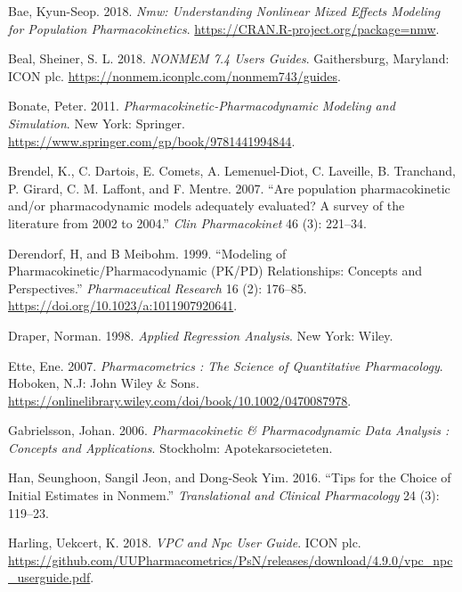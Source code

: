 \documentclass[
  11pt,
  krantz2, a4paper, twoside]{krantz}
\newlength{\cslhangindent}
\newenvironment{cslreferences}%
  {\setlength{\parindent}{0pt}%
  \everypar{\setlength{\hangindent}{\cslhangindent}}\ignorespaces}%
  {\par}
\theoremstyle{definition}
\theoremstyle{definition}
\theoremstyle{definition}
\theoremstyle{remark}
\begin{document}
\hypertarget{refs}{}
\begin{cslreferences}
\leavevmode\hypertarget{ref-R-nmw}{}%
Bae, Kyun-Seop. 2018. \emph{Nmw: Understanding Nonlinear Mixed Effects Modeling for Population Pharmacokinetics}. \url{https://CRAN.R-project.org/package=nmw}.

\leavevmode\hypertarget{ref-nonmem}{}%
Beal, Sheiner, S. L. 2018. \emph{NONMEM 7.4 Users Guides}. Gaithersburg, Maryland: ICON plc. \url{https://nonmem.iconplc.com/nonmem743/guides}.

\leavevmode\hypertarget{ref-bonate}{}%
Bonate, Peter. 2011. \emph{Pharmacokinetic-Pharmacodynamic Modeling and Simulation}. New York: Springer. \url{https://www.springer.com/gp/book/9781441994844}.

\leavevmode\hypertarget{ref-pmid17328581}{}%
Brendel, K., C. Dartois, E. Comets, A. Lemenuel-Diot, C. Laveille, B. Tranchand, P. Girard, C. M. Laffont, and F. Mentre. 2007. ``Are population pharmacokinetic and/or pharmacodynamic models adequately evaluated? A survey of the literature from 2002 to 2004.'' \emph{Clin Pharmacokinet} 46 (3): 221--34.

\leavevmode\hypertarget{ref-derendorf1999modeling}{}%
Derendorf, H, and B Meibohm. 1999. ``Modeling of Pharmacokinetic/Pharmacodynamic (PK/PD) Relationships: Concepts and Perspectives.'' \emph{Pharmaceutical Research} 16 (2): 176--85. \url{https://doi.org/10.1023/a:1011907920641}.

\leavevmode\hypertarget{ref-draper1998applied}{}%
Draper, Norman. 1998. \emph{Applied Regression Analysis}. New York: Wiley.

\leavevmode\hypertarget{ref-ette}{}%
Ette, Ene. 2007. \emph{Pharmacometrics : The Science of Quantitative Pharmacology}. Hoboken, N.J: John Wiley \& Sons. \url{https://onlinelibrary.wiley.com/doi/book/10.1002/0470087978}.

\leavevmode\hypertarget{ref-gabrielsson}{}%
Gabrielsson, Johan. 2006. \emph{Pharmacokinetic \& Pharmacodynamic Data Analysis : Concepts and Applications}. Stockholm: Apotekarsocieteten.

\leavevmode\hypertarget{ref-han2016tips}{}%
Han, Seunghoon, Sangil Jeon, and Dong-Seok Yim. 2016. ``Tips for the Choice of Initial Estimates in Nonmem.'' \emph{Translational and Clinical Pharmacology} 24 (3): 119--23.

\leavevmode\hypertarget{ref-vpcnpc}{}%
Harling, Uekcert, K. 2018. \emph{VPC and Npc User Guide}. ICON plc. \url{https://github.com/UUPharmacometrics/PsN/releases/download/4.9.0/vpc_npc_userguide.pdf}.


\end{cslreferences}
\end{document}
